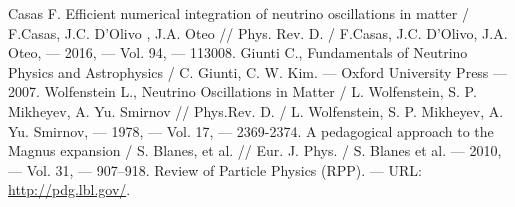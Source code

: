 \documentclass[12pt]{article}
\begin{document}
\newpage
{}
\begin{thebibliography}{99}
 Casas F. Efficient numerical
  integration of neutrino oscillations in matter / F.Casas, J.C. D'Olivo , J.A. Oteo // Phys. Rev. D. / F.Casas, J.C. D'Olivo, J.A. Oteo, — 2016, —
  Vol. 94, — 113008.
 Giunti C., Fundamentals of Neutrino Physics and Astrophysics / C. 
  Giunti, C. W. Kim. –– Oxford University Press –– 2007.
 Wolfenstein L., Neutrino Oscillations in Matter / L. Wolfenstein, S. 
 P. Mikheyev, A. Yu. Smirnov // Phys.Rev. D. / L. Wolfenstein, S. P. Mikheyev, A. Yu. Smirnov, — 1978, — Vol. 17, — 2369-2374.
 A pedagogical approach to the Magnus expansion / 
 S. Blanes, et al. // Eur. J. Phys. / S. Blanes et al. — 2010, — Vol. 31, — 907–918.
 \label{pdg} Review of Particle Physics (RPP). — URL: 
 \href{http://pdg.lbl.gov/}{http://pdg.lbl.gov/}.
\end{thebibliography}
\end{document}
